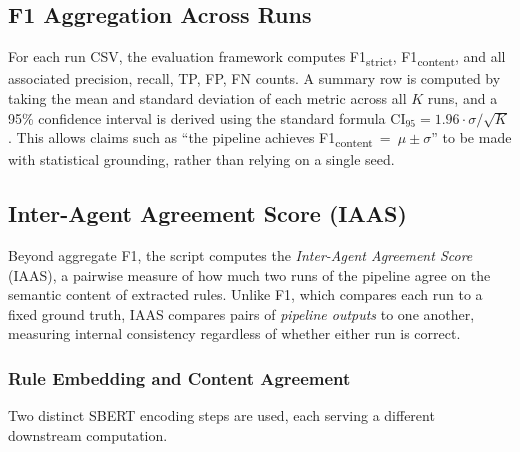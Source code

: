 ﻿\documentclass[11pt]{article}
\begin{document}
\subsection{F1 Aggregation Across Runs}
\label{sec:multirun_f1}

For each run CSV, the evaluation framework computes
F1\textsubscript{strict}, F1\textsubscript{content}, and all associated
precision, recall, TP, FP, FN counts.
A summary row is computed by taking the mean and standard deviation of each
metric across all $K$ runs, and a 95\% confidence interval is derived using
the standard formula $\text{CI}_{95} = 1.96 \cdot \sigma / \sqrt{K}$.
This allows claims such as
``the pipeline achieves F1\textsubscript{content}~=~$\mu \pm \sigma$'' to be
made with statistical grounding, rather than relying on a single seed.

\subsection{Inter-Agent Agreement Score (IAAS)}
\label{sec:iaas}

Beyond aggregate F1, the script computes the \emph{Inter-Agent Agreement Score}
(IAAS), a pairwise measure of how much two runs of the pipeline agree on the
semantic content of extracted rules.
Unlike F1, which compares each run to a fixed ground truth, IAAS compares
pairs of \emph{pipeline outputs} to one another, measuring internal consistency
regardless of whether either run is correct.

\subsubsection{Rule Embedding and Content Agreement}

Two distinct SBERT encoding steps are used, each serving a different downstream
computation.
\end{document}
